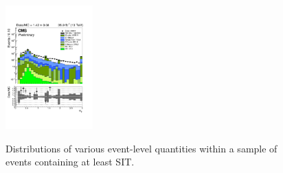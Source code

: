 \begin{figure}[h!]
\begin{center}
    \includegraphics[width=0.3\textwidth,page=12,trim=0 100 50 100,clip]{figures/SITV/Event/Event.pdf}\\
    \caption{Distributions of various event-level quantities within a
      sample of \mj events containing at least SIT.}
    \label{fig:dataMC_SITEvent_mu}
  \end{center} 
\end{figure}


